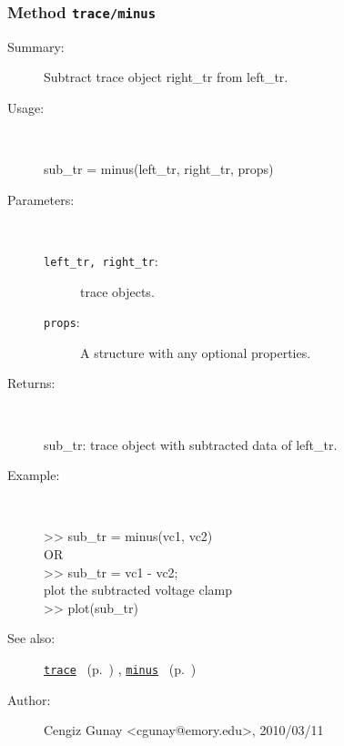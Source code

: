 \subsubsection[Method \texttt{minus}]{Method \texttt{trace/minus}}%
%
\label{ref_trace__minus}%
\hypertarget{ref_trace__minus}{}%
\begin{description}
\item[Summary:]Subtract trace object right\_tr from left\_tr.
%
\item[Usage:]~%
\begin{lyxcode}%
sub\_tr = minus(left\_tr, right\_tr, props)
%
\end{lyxcode}%
%
%
\item[Parameters:]~
\begin{description}%
\item[\texttt{left\_tr, right\_tr}:]
 trace objects.
\item[\texttt{props}:]
 A structure with any optional properties.
\end{description}%
%
\item[Returns:
]~

   sub\_tr: trace object with subtracted data of left\_tr.
%
\item[Example:]~
\begin{lyxcode} >> sub\_tr = minus(vc1, vc2)
\\%
 OR
\\%
 >> sub\_tr = vc1 - vc2;
\\%
 plot the subtracted voltage clamp
\\%
 >> plot(sub\_tr)
\\%
\end{lyxcode}
%
\item[See also:]%
\hyperlink{ref_trace}{\texttt{trace}}%
\ (p.~\pageref{ref_trace})%
%
, \hyperlink{ref_minus}{\texttt{minus}}%
\ (p.~\pageref{ref_minus})%
%
%
\item[Author:]%
Cengiz Gunay <cgunay@emory.edu>, 2010/03/11
%
\end{description}
\methodline%
